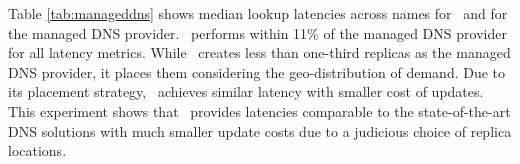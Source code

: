 


Table \ref{tab:manageddns} shows median lookup latencies across names for \auspice\ and for the managed DNS provider.
\auspice\ performs within 11\% of the managed DNS provider for all latency metrics. 
While \auspice\ creates less than one-third replicas as the managed DNS provider, it places them considering the geo-distribution of demand. 
Due to its placement strategy, \auspice\ achieves  similar latency with smaller cost of updates.
 This experiment shows that \auspice\ provides  latencies comparable to the state-of-the-art DNS solutions with much smaller update costs due to a judicious choice of replica locations. 




